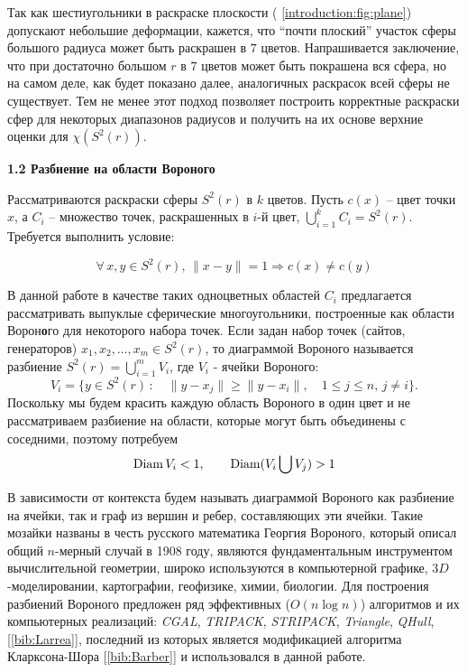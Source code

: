 Так как шестиугольники в раскраске плоскости (\figurename{ \ref{introduction:fig:plane}}) допускают небольшие деформации, кажется, что \enquote{почти плоский} участок сферы большого радиуса может быть раскрашен в $7$ цветов. Напрашивается заключение, что при достаточно большом $r$ в $7$ цветов может быть покрашена вся сфера, но на самом деле, как будет показано далее, аналогичных раскрасок всей сферы не существует. Тем не менее этот подход позволяет построить корректные 
раскраски сфер для некоторых диапазонов радиусов и получить на их основе верхние оценки для $\chi(S^2(r))$.

\vspace{5pt}
\textbf{1.2 Разбиение на области Вороного}\label{chapters:1.2}
\vspace{5pt}

Рассматриваются раскраски сферы $S^2(r)$ в $k$ цветов. 
Пусть $c(x)$ -- цвет точки $x$, а $C_i$ -- множество точек, раскрашенных в $i$-й цвет, $\bigcup\limits_{i=1}^{k} C_i = S^2(r)$. 
Требуется выполнить условие:

\begin{equation}\label{chapter1:propercoloring}
\forall \, x,y \in S^2(r), \, \|x - y\|=1 \Rightarrow c(x) \ne c(y)
\end{equation}

В данной работе в качестве таких одноцветных областей $C_i$ предлагается 
рассматривать выпуклые сферические многоугольники, построенные как области Ворон\textbf{о}го для некоторого набора точек.
Если задан набор точек (сайтов, генераторов) $x_1, x_2, \dots , x_m \in S^2(r)$, то диаграммой Вороного называется разбиение
$S^2(r)= \bigcup\limits_{i=1}^m V_i$, где $V_i$ - ячейки Вороного:
$$V_i = \{y \in S^2(r) \, : \quad \|y - x_j\| \geq \|y - x_i\|, \quad 1 \leq j \leq n, \, j \neq i \}.$$
Поскольку мы будем красить каждую область Вороного в один цвет и не 
рассматриваем разбиение на области, которые могут быть объединены с соседними, поэтому потребуем
\begin{equation}\label{chapter1:eq:diams}
\operatorname{Diam} V_i < 1, \qquad \operatorname{Diam} (V_i \bigcup V_j) > 1
\end{equation}

В зависимости от контекста будем называть диаграммой Вороного как разбиение на ячейки, так и граф из вершин и ребер, составляющих эти ячейки. Такие мозайки названы в честь русского математика Георгия Вороного, который описал общий $n$-мерный случай в 1908 году,
являются фундаментальным инструментом вычислительной геометрии, широко используются в компьютерной графике, $3D$-моделировании, картографии, геофизике, химии, биологии. 
Для построения разбиений Вороного предложен ряд эффективных ($O(n\log{}n)$) алгоритмов и их компьютерных реализаций: 
\textit{CGAL}, \textit{TRIPACK}, \textit{STRIPACK}, \textit{Triangle}, \textit{QHull}, 
[\ref{bib:Larrea}], последний из которых является модификацией алгоритма Кларксона-Шора [\ref{bib:Barber}] и использовался в данной работе.

